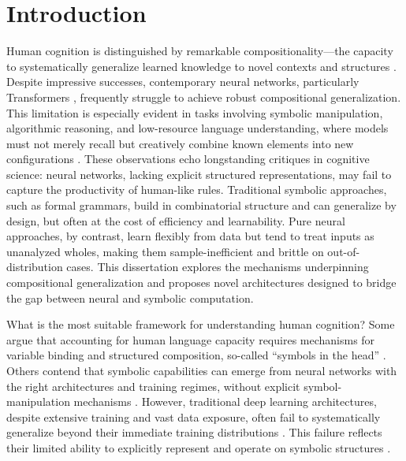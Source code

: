 \chapter{Introduction} \label{chap:chap-0}

Human cognition is distinguished by remarkable compositionality—the capacity to systematically generalize learned knowledge to novel contexts and structures \citep{fodor1988connectionism,Lake_2018_GeneralizationSystematicityCompositional}. Despite impressive successes, contemporary neural networks, particularly Transformers \citep{vaswani2017attention}, frequently struggle to achieve robust compositional generalization. This limitation is especially evident in tasks involving symbolic manipulation, algorithmic reasoning, and low-resource language understanding, where models must not merely recall but creatively combine known elements into new configurations \citep{Marcus2001-MARTAM-10, Lake_2018_GeneralizationSystematicityCompositional}. These observations echo longstanding critiques in cognitive science: neural networks, lacking explicit structured representations, may fail to capture the productivity of human-like rules. Traditional symbolic approaches, such as formal grammars, build in combinatorial structure and can generalize by design, but often at the cost of efficiency and learnability. Pure neural approaches, by contrast, learn flexibly from data but tend to treat inputs as unanalyzed wholes, making them sample-inefficient and brittle on out-of-distribution cases. This dissertation explores the mechanisms underpinning compositional generalization and proposes novel architectures designed to bridge the gap between neural and symbolic computation.

What is the most suitable framework for understanding human cognition? Some argue that accounting for human language capacity requires mechanisms for variable binding and structured composition, so-called “symbols in the head” \citep{Marcus2001-MARTAM-10, tenenbaum2011grow}. Others contend that symbolic capabilities can emerge from neural networks with the right architectures and training regimes, without explicit symbol-manipulation mechanisms \citep{elman_finding_1990, rumelhart1986c}. However, traditional deep learning architectures, despite extensive training and vast data exposure, often fail to systematically generalize beyond their immediate training distributions \citep{kim_cogs_2020, hupkes2020compositionality, najoung}. This failure reflects their limited ability to explicitly represent and operate on symbolic structures \citep{smolensky_tensor_1990}.

